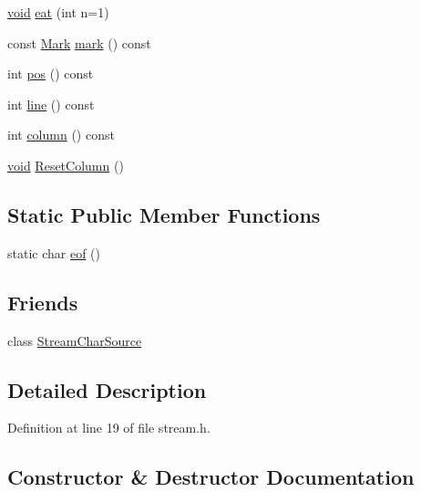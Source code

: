 \begin{DoxyCompactItemize}
\item 
\mbox{\hyperlink{glad_8h_a950fc91edb4504f62f1c577bf4727c29}{void}} \mbox{\hyperlink{class_y_a_m_l_1_1_stream_ac79171e6d96a34e9edde03edbc6c3e2e}{eat}} (int n=1)
\item 
const \mbox{\hyperlink{struct_y_a_m_l_1_1_mark}{Mark}} \mbox{\hyperlink{class_y_a_m_l_1_1_stream_a1984b6def1e7f09e8be1e2ded43e7c22}{mark}} () const
\item 
int \mbox{\hyperlink{class_y_a_m_l_1_1_stream_a497b0f9891b3f62b3101c54df60b6eb2}{pos}} () const
\item 
int \mbox{\hyperlink{class_y_a_m_l_1_1_stream_a871e35c3a11e57e33b26c62be7db6d72}{line}} () const
\item 
int \mbox{\hyperlink{class_y_a_m_l_1_1_stream_a5bf908c973c4ca1969e69c051ba8a33f}{column}} () const
\item 
\mbox{\hyperlink{glad_8h_a950fc91edb4504f62f1c577bf4727c29}{void}} \mbox{\hyperlink{class_y_a_m_l_1_1_stream_a34f1b7be035ae5862daac235159cd3cf}{Reset\+Column}} ()
\end{DoxyCompactItemize}
\subsection*{Static Public Member Functions}
\begin{DoxyCompactItemize}
\item 
static char \mbox{\hyperlink{class_y_a_m_l_1_1_stream_a250498ea5d09cd3f65da475d46ecd9ae}{eof}} ()
\end{DoxyCompactItemize}
\subsection*{Friends}
\begin{DoxyCompactItemize}
\item 
class \mbox{\hyperlink{class_y_a_m_l_1_1_stream_ab86b2135b1417f3c5782b5b7163f0758}{Stream\+Char\+Source}}
\end{DoxyCompactItemize}


\subsection{Detailed Description}


Definition at line 19 of file stream.\+h.



\subsection{Constructor \& Destructor Documentation}
\mbox{\label{class_y_a_m_l_1_1_stream_af1df4e8380675578b48f45b2c2757701}} 
